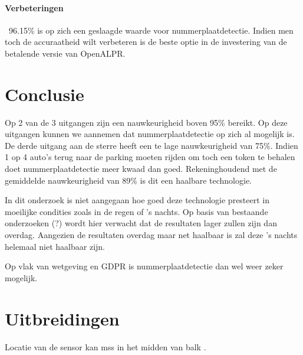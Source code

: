 \paragraph{Verbeteringen}\
96.15\% is op zich een geslaagde waarde voor nummerplaatdetectie. Indien men toch de accuraatheid wilt verbeteren is de beste optie in de investering van de betalende versie van OpenALPR.

\section{Conclusie}
Op 2 van de 3 uitgangen zijn een nauwkeurigheid boven 95\% bereikt. Op deze uitgangen kunnen we aannemen dat nummerplaatdetectie op zich al mogelijk is. De derde uitgang aan de sterre heeft een te lage nauwkeurigheid van 75\%. Indien 1 op 4 auto's terug naar de parking moeten rijden om toch een token te behalen doet nummerplaatdetectie meer kwaad dan goed. Rekeninghoudend met de gemiddelde nauwkeurigheid van 89\% is dit een haalbare technologie.

In dit onderzoek is niet aangegaan hoe goed deze technologie presteert in moeilijke condities zoals in de regen of 's nachts. Op basis van bestaande onderzoeken (?) wordt hier verwacht dat de resultaten lager zullen zijn dan overdag. Aangezien de resultaten overdag maar net haalbaar is zal deze 's nachts helemaal niet haalbaar zijn.

Op vlak van wetgeving en GDPR is nummerplaatdetectie dan wel weer zeker mogelijk.

\section{Uitbreidingen}
Locatie van de sensor kan mss in het midden van balk \autocite{buhus2016automatic}.